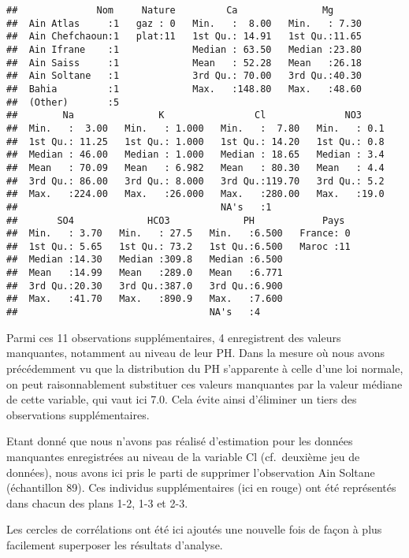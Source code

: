 \documentclass[]{article}
\begin{document}
\begin{verbatim}
##              Nom     Nature         Ca               Mg       
##  Ain Atlas     :1   gaz : 0   Min.   :  8.00   Min.   : 7.30  
##  Ain Chefchaoun:1   plat:11   1st Qu.: 14.91   1st Qu.:11.65  
##  Ain Ifrane    :1             Median : 63.50   Median :23.80  
##  Ain Saiss     :1             Mean   : 52.28   Mean   :26.18  
##  Ain Soltane   :1             3rd Qu.: 70.00   3rd Qu.:40.30  
##  Bahia         :1             Max.   :148.80   Max.   :48.60  
##  (Other)       :5                                             
##        Na               K                Cl              NO3      
##  Min.   :  3.00   Min.   : 1.000   Min.   :  7.80   Min.   : 0.1  
##  1st Qu.: 11.25   1st Qu.: 1.000   1st Qu.: 14.20   1st Qu.: 0.8  
##  Median : 46.00   Median : 1.000   Median : 18.65   Median : 3.4  
##  Mean   : 70.09   Mean   : 6.982   Mean   : 80.30   Mean   : 4.4  
##  3rd Qu.: 86.00   3rd Qu.: 8.000   3rd Qu.:119.70   3rd Qu.: 5.2  
##  Max.   :224.00   Max.   :26.000   Max.   :280.00   Max.   :19.0  
##                                    NA's   :1                      
##       SO4             HCO3             PH            Pays   
##  Min.   : 3.70   Min.   : 27.5   Min.   :6.500   France: 0  
##  1st Qu.: 5.65   1st Qu.: 73.2   1st Qu.:6.500   Maroc :11  
##  Median :14.30   Median :309.8   Median :6.500              
##  Mean   :14.99   Mean   :289.0   Mean   :6.771              
##  3rd Qu.:20.30   3rd Qu.:387.0   3rd Qu.:6.900              
##  Max.   :41.70   Max.   :890.9   Max.   :7.600              
##                                  NA's   :4
\end{verbatim}

Parmi ces 11 observations supplémentaires, 4 enregistrent des valeurs
manquantes, notamment au niveau de leur PH. Dans la mesure où nous avons
précédemment vu que la distribution du PH s'apparente à celle d'une loi
normale, on peut raisonnablement substituer ces valeurs manquantes par
la valeur médiane de cette variable, qui vaut ici 7.0. Cela évite ainsi
d'éliminer un tiers des observations supplémentaires.

Etant donné que nous n'avons pas réalisé d'estimation pour les données
manquantes enregistrées au niveau de la variable Cl (cf.~deuxième jeu de
données), nous avons ici pris le parti de supprimer l'observation Ain
Soltane (échantillon 89). Ces individus supplémentaires (ici en rouge)
ont été représentés dans chacun des plans 1-2, 1-3 et 2-3.

Les cercles de corrélations ont été ici ajoutés une nouvelle fois de
façon à plus facilement superposer les résultats d'analyse.
\end{document}
